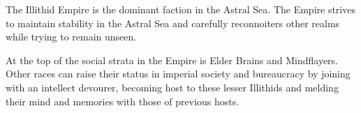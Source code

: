 The Illithid Empire is the dominant faction in the Astral Sea.
The Empire strives to maintain stability in the Astral Sea and carefully reconnoiters other realms while trying to remain unseen.

At the top of the social strata in the Empire is Elder Brains and Mindflayers.
Other races can raise their status in imperial society and bureaucracy by joining with an intellect devourer, becoming host to these lesser Illithids and melding their mind and memories with those of previous hosts.
